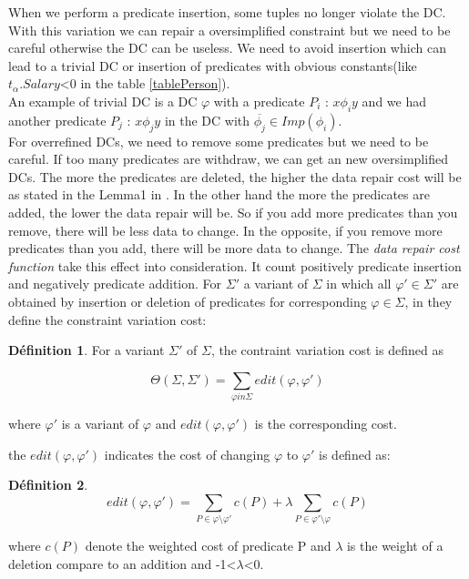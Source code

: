 \documentclass[letterpaper, 12pt]{report}
\theoremstyle{definition}
\newtheorem{mydef}{Définition}
\begin{document}
When we perform a predicate insertion, some tuples no longer violate the DC. With this variation we can repair a oversimplified constraint but we need to be careful otherwise the DC can be useless. We need to avoid insertion which can lead to a trivial DC or insertion of predicates with obvious constants(like $t_\alpha.Salary$<0 in the table \ref{tablePerson}). \\

An example of trivial DC is a DC $\varphi$ with a predicate $P_i$ : $x \phi_i y$ and we had another predicate $P_j$ : $x \phi_j y$ in the DC with $\overline{\phi_j} \in Imp(\phi_i)$. \\

For overrefined DCs, we need to remove some predicates but we need to be careful. If too many predicates are withdraw, we can get an new oversimplified DCs. The more the predicates are deleted, the higher the data repair cost will be as stated in the Lemma1 in \cite{main}. In the other hand the more the predicates are added, the lower the data repair will be. So if you add more predicates than you remove, there will be less data to change. In the opposite, if you remove more predicates than you add, there will be more data to change. The \emph{data repair cost function} take this effect into consideration. It count positively predicate insertion and negatively predicate addition. For $\Sigma '$ a variant of $\Sigma$ in which all $\varphi ' \in \Sigma '$ are obtained by insertion or deletion of predicates for corresponding $\varphi \in \Sigma$, in \cite{main} they define the constraint variation cost:

\begin{mydef}
For a variant $\Sigma '$ of $\Sigma$, the contraint variation cost is defined as

$$\Theta (\Sigma,\Sigma ') = \sum_{\varphi in \Sigma} edit(\varphi,\varphi ')$$

\hspace*{2cm} where $\varphi '$ is a variant of $\varphi$ and $edit(\varphi,\varphi ')$ is the corresponding cost.
\end{mydef}

the $edit(\varphi , \varphi ')$ indicates the cost of changing $\varphi$ to $\varphi'$ is defined as:
\begin{mydef}
$$
 edit(\varphi, \varphi') = \sum_{P \in \varphi \setminus \varphi'} c(P) + \lambda \sum_{P \in \varphi' \setminus \varphi} c(P)$$
 
where $c(P)$ denote the weighted cost of predicate P and $\lambda$ is the weight of a deletion compare to an addition and -1<$\lambda$<0.
\end{mydef}
\end{document}

